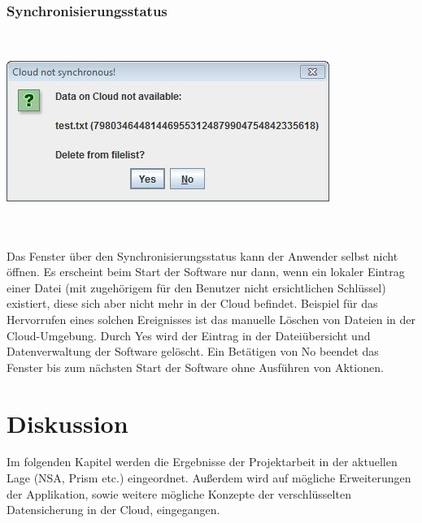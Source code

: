 \documentclass[13pt,a4paper,bibliography=totocnumbered,listof=totocnumbered]{scrartcl}
\begin{document}
\subsubsection{Synchronisierungsstatus}
$\;$\\
\begin{minipage}{\linewidth}
	\centering
	\includegraphics[width=0.4\linewidth]{./img/Synchron.jpg}
	\label{Synchron}
\end{minipage}
\\\\Das Fenster über den Synchronisierungsstatus kann der Anwender selbst nicht öffnen. Es erscheint beim Start der Software nur dann, wenn ein lokaler Eintrag einer Datei (mit zugehörigem für den Benutzer nicht ersichtlichen Schlüssel) existiert, diese sich aber nicht mehr in der Cloud befindet. Beispiel für das Hervorrufen eines solchen Ereignisses ist das manuelle Löschen von Dateien in der Cloud-Umgebung. Durch Yes wird der Eintrag in der Dateiübersicht und Datenverwaltung der Software gelöscht. Ein Betätigen von No beendet das Fenster bis zum nächsten Start der Software ohne Ausführen von Aktionen.
\pagebreak

\section{Diskussion}\label{DiskussionV}
Im folgenden Kapitel werden die Ergebnisse der Projektarbeit in der aktuellen Lage (NSA, Prism etc.) eingeordnet. Außerdem wird auf mögliche Erweiterungen der Applikation, sowie weitere mögliche Konzepte der verschlüsselten Datensicherung in der Cloud, eingegangen. 
\end{document}
